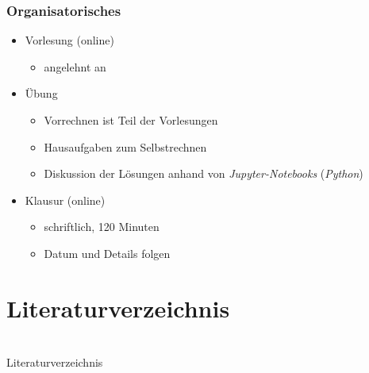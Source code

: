 \documentclass[hyperref={pdfpagemode=FullScreen, colorlinks=false}]{beamer}
\begin{document}
\begin{frame}
\frametitle{Organisatorisches}
    \begin{itemize}
        \item Vorlesung (online)
        \begin{itemize}
         \item angelehnt an \textsl{\cite{Verruijt2010, Vrettos2017, Schmidt2017}}
        \end{itemize}
        
        \item Übung
                \begin{itemize} 
                \item Vorrechnen ist Teil der Vorlesungen
                \item Hausaufgaben zum Selbstrechnen
                \item Diskussion der Lösungen anhand von \textsl{Jupyter-Notebooks} (\textsl{Python})
        \end{itemize}

        \item Klausur (online)
        \begin{itemize}
         \item schriftlich, 120 Minuten
         \item Datum und Details folgen
        \end{itemize}
    \end{itemize}

\end{frame}

\section{Literaturverzeichnis}

\section{} %
\begin{frame}[allowframebreaks]{Literaturverzeichnis}
	\printbibliography
\end{frame}
\end{document}
